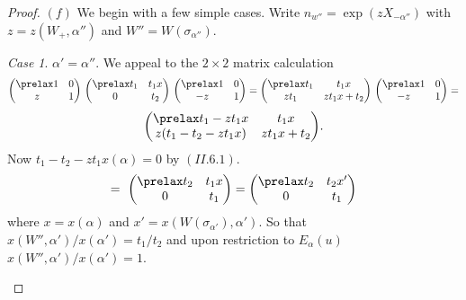 \documentclass{memo-l}
\theoremstyle{definition}
\theoremstyle{remark}
\newtheorem{case}{Case}
\numberwithin{section}{chapter}
\numberwithin{equation}{chapter}
\begin{document}
\begin{proof}
   $(f)$ We begin with a few simple cases.  Write $n_{w''}  =
\exp(zX_{-{\alpha}''})$ with $z = z(W_{+},{\alpha''})$ and $W''  =
W({\sigma}_{{\alpha''}})$.


\begin{case} %
${\alpha}' = {\alpha''}$.  We appeal to the $2\times 2$ matrix
calculation
$$
{\begin{pmatrix} \prelax  1 & 0 \\ z & 1 \end{pmatrix}}\
{\begin{pmatrix} \prelax
 t_1 & t_1x \\ 0 & t_2 \end{pmatrix}}\
{\begin{pmatrix} \prelax
 1 & 0 \\ -z & 1 \end{pmatrix}}
=
{\begin{pmatrix} \prelax
 t_1 & t_1x \\ zt_1 & zt_1x+t_2 \end{pmatrix}}\
{\begin{pmatrix} \prelax
 1 & 0 \\ -z & 1 \end{pmatrix}} =
$$
$$
{\begin{pmatrix} \prelax
 t_1-zt_1x & t_1x \\
z(t_1-t_2-zt_1x) & zt_1x+t_2 \end{pmatrix}} .
$$
Now $t_{1}-t_{2}-zt_{1}x({\alpha})  =  0$ by $(II.6.1)$.
$$
=\ {\begin{pmatrix} \prelax
t_2 & t_1x \\ 0 & t_1 \end{pmatrix}} =
{\begin{pmatrix} \prelax
t_2 & t_2x' \\ 0 & t_1 \end{pmatrix}}
$$
where $x = x({\alpha})$ and $x'  =
x(W({\sigma}_{{\alpha}'}),{\alpha}')$.  So that
$x(W'',{\alpha}')/x({\alpha}')  =  t_{1}/t_{2}$ and upon restriction to
$E_{{\alpha}}(u)$ $x(W'',{\alpha}')/x({\alpha}')  =  1$.
\end{case}


\end{proof}
\end{document}
